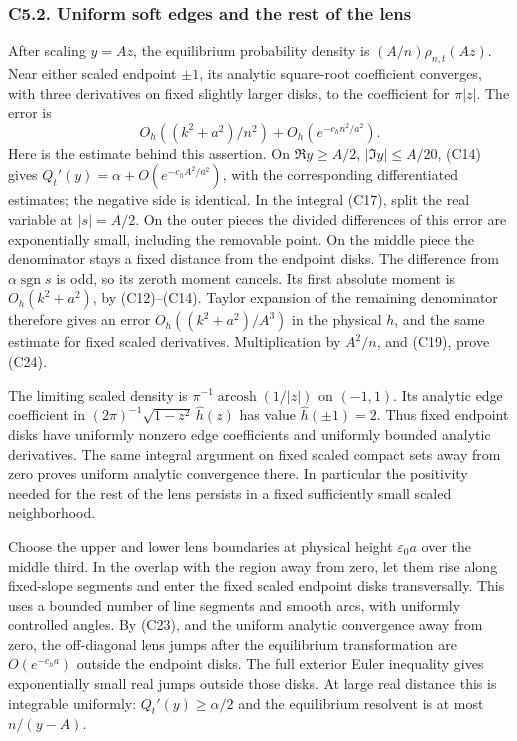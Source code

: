 \documentclass[11pt,a4paper]{article}
\begin{document}
\subsubsection{C5.2. Uniform soft edges and the rest of the
lens}\label{sa:c5.2.-uniform-soft-edges-and-the-rest-of-the-lens}

After scaling \(y=Az\), the equilibrium probability density is
\((A/n)\rho_{n,t}(Az)\). Near either scaled endpoint \(\pm1\), its
analytic square-root coefficient converges, with three derivatives on
fixed slightly larger disks, to the coefficient for \(\pi|z|\). The
error is \[
O_h((k^2+a^2)/n^2)+O_h(e^{-c_hn^2/a^2}).\tag{C24}
\] Here is the estimate behind this assertion. On \(\Re y\ge A/2\),
\(|\Im y|\le A/20\), (C14) gives \(Q_t'(y)=\alpha+O(e^{-c_h A^2/a^2})\),
with the corresponding differentiated estimates; the negative side is
identical. In the integral (C17), split the real variable at
\(|s|=A/2\). On the outer pieces the divided differences of this error
are exponentially small, including the removable point. On the middle
piece the denominator stays a fixed distance from the endpoint disks.
The difference from \(\alpha\operatorname{sgn}s\) is odd, so its zeroth
moment cancels. Its first absolute moment is \(O_h(k^2+a^2)\), by
(C12)--(C14). Taylor expansion of the remaining denominator therefore
gives an error \(O_h((k^2+a^2)/A^3)\) in the physical \(h\), and the
same estimate for fixed scaled derivatives. Multiplication by \(A^2/n\),
and (C19), prove (C24).

The limiting scaled density is \(\pi^{-1}\operatorname{arcosh}(1/|z|)\)
on \((-1,1)\). Its analytic edge coefficient in
\((2\pi)^{-1}\sqrt{1-z^2}\,\widehat h(z)\) has value
\(\widehat h(\pm1)=2\). Thus fixed endpoint disks have uniformly nonzero
edge coefficients and uniformly bounded analytic derivatives. The same
integral argument on fixed scaled compact sets away from zero proves
uniform analytic convergence there. In particular the positivity needed
for the rest of the lens persists in a fixed sufficiently small scaled
neighborhood.

Choose the upper and lower lens boundaries at physical height
\(\varepsilon_0a\) over the middle third. In the overlap with the region
away from zero, let them rise along fixed-slope segments and enter the
fixed scaled endpoint disks transversally. This uses a bounded number of
line segments and smooth arcs, with uniformly controlled angles. By
(C23), and the uniform analytic convergence away from zero, the
off-diagonal lens jumps after the equilibrium transformation are
\(O(e^{-c_ha})\) outside the endpoint disks. The full exterior Euler
inequality gives exponentially small real jumps outside those disks. At
large real distance this is integrable uniformly: \(Q_t'(y)\ge\alpha/2\)
and the equilibrium resolvent is at most \(n/(y-A)\).
\end{document}
